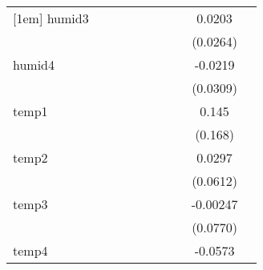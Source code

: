 {\begin{tabular}{l*{9}{c}}
[1em]
humid3      &                     &                     &                     &                     &                     &                     &                     &      0.0203         &                     \\
            &                     &                     &                     &                     &                     &                     &                     &    (0.0264)         &                     \\
[1em]
humid4      &                     &                     &                     &                     &                     &                     &                     &     -0.0219         &                     \\
            &                     &                     &                     &                     &                     &                     &                     &    (0.0309)         &                     \\
[1em]
temp1       &                     &                     &                     &                     &                     &                     &                     &       0.145         &                     \\
            &                     &                     &                     &                     &                     &                     &                     &     (0.168)         &                     \\
[1em]
temp2       &                     &                     &                     &                     &                     &                     &                     &      0.0297         &                     \\
            &                     &                     &                     &                     &                     &                     &                     &    (0.0612)         &                     \\
[1em]
temp3       &                     &                     &                     &                     &                     &                     &                     &    -0.00247         &                     \\
            &                     &                     &                     &                     &                     &                     &                     &    (0.0770)         &                     \\
[1em]
temp4       &                     &                     &                     &                     &                     &                     &                     &     -0.0573         &                     \\

\end{tabular}}
